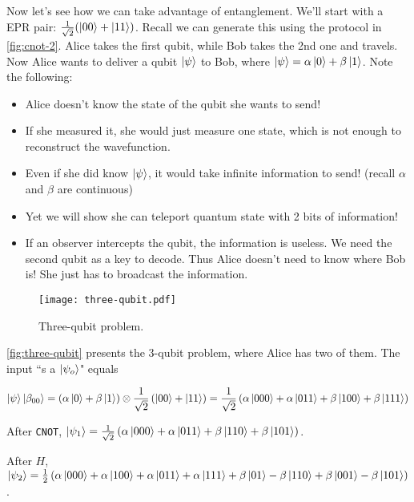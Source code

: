 \documentclass[12pt, english]{book}
\begin{document}
Now let's see how we can take advantage of entanglement. 
We'll start with a EPR pair: $\frac{1}{\sqrt{2}} (\ket{00} + \ket{11})$.
Recall we can generate this using the protocol in \autoref{fig:cnot-2}.
Alice takes the first qubit, while Bob takes the 2nd one and travels.
Now Alice wants to deliver a qubit $\ket{\psi}$ to Bob, where $\ket{\psi} = \alpha \ket{0} + \beta \ket{1}$.
Note the following:

\begin{itemize}
	\item Alice doesn't know the state of the qubit she wants to send!
	
	\item If she measured it, she would just measure one state, which is not enough to reconstruct the wavefunction.
	
	\item Even if she did know $\ket{\psi}$, it would take infinite information to send! 
	(recall $\alpha$ and $\beta$ are continuous)
	
	\item Yet we will show she can teleport quantum state with 2 bits of information!
	
	\item If an observer intercepts the qubit, the information is useless.
	We need the second qubit as a key to decode.
	Thus Alice doesn't need to know where Bob is! 
	She just has to broadcast the information.
\end{itemize}

\begin{figure}[!ht]
	\centering
	\texttt{[image: three-qubit.pdf]}
	\caption{Three-qubit problem.}
	\label{fig:three-qubit}
\end{figure}

\autoref{fig:three-qubit} presents the 3-qubit problem, where Alice has two of them.
The input ``s a $\ket{\psi_o}$" equals

\[ \ket{\psi} \ket{\beta_{00}} = \left( \alpha \ket{0} + \beta \ket{1} \right) \otimes \frac{1}{\sqrt{2}} \left( \ket{00} + \ket{11} \right) = \frac{1}{\sqrt{2}} \left( \alpha \ket{000} + \alpha \ket{011} + \beta \ket{100} + \beta \ket{111} \right) \]

After \texttt{CNOT}, $\ket{\psi_1} = \frac{1}{\sqrt{2}} \left( \alpha \ket{000} + \alpha \ket{011} + \beta \ket{110} + \beta \ket{101} \right)$.

After $H$, $\ket{\psi_2} = \frac{1}{2} \left( \alpha \ket{000} + \alpha \ket{100} + \alpha \ket{011} + \alpha \ket{111} + \beta \ket{01} - \beta \ket{110} + \beta \ket{001} - \beta \ket{101} \right)$.
\end{document}
